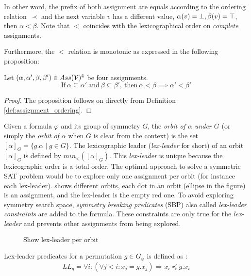In other word, the prefix of both assignment are equals according to the ordering relation~$\prec$
and the next variable $v$ has a different value, $\alpha(v) = \bot, \beta(v) = \top$, then $\alpha < \beta$.
Note that $<$ coincides with the lexicographical order on \emph{complete}
assignments. 

Furthermore, the $<$ relation is monotonic as expressed in the following proposition:

\begin{proposition}
	\label{prop:monocity_assignments_ordering}
	Let  $(\alpha,\alpha',\beta,\beta') \in Ass(\mathcal{V})^4 $ be four assignments.
	$$\text{If}~\alpha \subseteq \alpha'~\text{and}~\beta \subseteq \beta',~\text{then}~\alpha < \beta \implies \alpha' < \beta'$$
\end{proposition}

\begin{proof}
	The proposition follows on directly from Definition \ref{def:assignment_ordering}.
\end{proof}


Given a formula $\varphi$ and its group of symmetry $G$,
the \emph{orbit of $\alpha$ under $G$} (or
simply the \emph{orbit of $\alpha$} when $G$ is clear from the context) is the set
$ [\alpha]_G=\{ g.\alpha \mid g \in G \}$. 
The lexicographic leader (\textit{lex-leader} for short) of an orbit $[\alpha]_G$ is defined by
$min_<([\alpha]_G)$. This \textit{lex-leader} is unique because the lexicographic
order is a total order.
The optimal approach to solve a symmetric SAT problem would be to explore
only one assignment per orbit (for instance each lex-leader).  shows different orbits, each dot in an orbit (ellipse in the figure) is an assignment, and the lex-leader is the empty red one.
To avoid exploring 
symmetry search space, \emph{symmetry breaking predicates} (SBP) also called \emph{lex-leader constraints} 
are added to the formula.
These constraints are only true for the \emph{lex-leader} \cite{crawford1996symmetry} and prevents other assignments from being explored. 

\begin{figure}[!htbp]
	\centering
	
	\caption{Show lex-leader per orbit}
	\label{fig:lex-leader}
\end{figure}


Lex-leader predicates for a permutation $g \in G_\varphi$ is defined as :
$$LL_g = \forall i : (\forall j < i : x_j = g.x_j) \Rightarrow  x_i \preceq g.x_i$$

